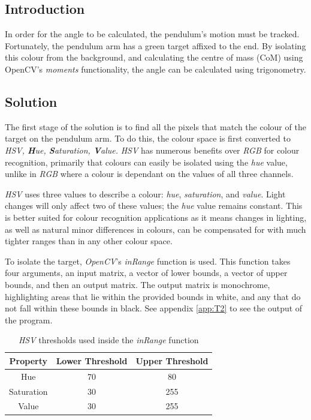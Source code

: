 \documentclass[conference]{IEEEtran}
\begin{document}
\subsection{Introduction}
In order for the angle to be calculated, the pendulum's motion must be tracked. Fortunately, the pendulum arm has a green target affixed to the end. By isolating this colour from the background, and calculating the centre of mass (CoM) using OpenCV's \textit{moments} functionality, the angle can be calculated using trigonometry.
\subsection{Solution}\label{2_solution}
The first stage of the solution is to find all the pixels that match the colour of the target on the pendulum arm. To do this, the colour space is first converted to \textit{HSV, \textbf{H}ue, \textbf{S}aturation, \textbf{V}alue.} \textit{HSV} has numerous benefits over \textit{RGB} for colour recognition\cite{RBGvHSV}, primarily that colours can easily be isolated using the \textit{hue} value, unlike in \textit{RGB} where a colour is dependant on the values of all three channels.

 \textit{HSV} uses three values to describe a colour: \textit{hue}, \textit{saturation}, and \textit{value}. Light changes will only affect two of these values; the \textit{hue} value remains constant. This is better suited for colour recognition applications as it means changes in lighting, as well as natural minor differences in colours, can be compensated for with much tighter ranges than in any other colour space.

To isolate the target, \textit{OpenCV}'s \textit{inRange} function is used. This function takes four arguments, an input matrix, a vector of lower bounds, a vector of upper bounds, and then an output matrix. The output matrix is monochrome, highlighting areas that lie within the provided bounds in white, and any that do not fall within these bounds in black. See appendix \ref{app:T2} to see the output of the program.

\begin{table}[H]
\caption{\textit{HSV} thresholds used inside the \textit{inRange} function}
\label{tab:t2thresholds}
\centering
\begin{tabular}{|c||c|c|}
\hline
Property & Lower Threshold & Upper Threshold\\
\hline
Hue & 70 & 80\\
\hline
Saturation & 30 & 255\\
\hline
Value & 30 & 255\\
\hline
\end{tabular}
\end{table}
\end{document}
